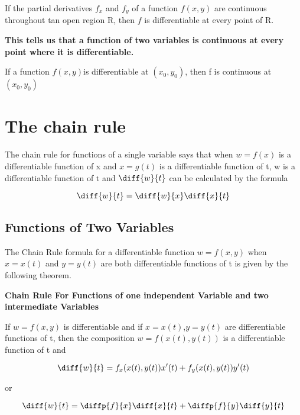 \documentclass[12pt,a4paper,draft]{article}
\newenvironment{theorem}{\begin{theorembox}}{\end{theorembox}\vspace{1\baselineskip}}
\newenvironment{corollary}{\begin{corollarybox}}{\end{corollarybox}\vspace{1\baselineskip}}
\newcommand{\fxy}{\(f(x,y)\)}
\begin{document}
\begin{corollary}
    If the partial derivatives \(f_x\) and \(f_y\) of a function \(f(x,y)\) are continuous throughout tan open region R, then \(f\) is differentiable at every point of R. 

\end{corollary}


\textbf{This tells us that a function of two variables is continuous at every point where it is differentiable.
}


\begin{theorem}
    If a function \fxy is differentiable at \((x_0,y_0)\), then f is continuous at \((x_0,y_0)\)
\end{theorem}

\newpage

\section{The chain rule}

The chain rule for functions of a single variable says that when \(w = f(x)\) is a differentiable function of x and \(x= g(t)\) is a differentiable function of t, w is a differentiable function of t and \(\diff{w}{t}\) can be calculated by the formula

\[\diff{w}{t} = \diff{w}{x}\diff{x}{t}\]


\subsection{Functions of Two Variables}

The Chain Rule formula for a differentiable function \(w= f(x,y)\) when \(x = x(t)\) and \(y = y(t)\) are both differentiable functions of t is given by the following theorem.

\begin{theorem}
\textbf{Chain Rule For Functions of one independent Variable and two intermediate Variables}

If \(w = f(x,y)\) is differentiable and if \(x = x(t)\),\(y = y(t)\) are differentiable functions of t, then the composition \(w = f(x(t),y(t))\) is a differentiable function of t and 

\[\diff{w}{t} = f_x(x(t),y(t))x'(t) + f_y(x(t), y(t))y'(t)\]

or

\[\diff{w}{t} = \diffp{f}{x}\diff{x}{t} + \diffp{f}{y}\diff{y}{t}\]


\end{theorem}
\end{document}
